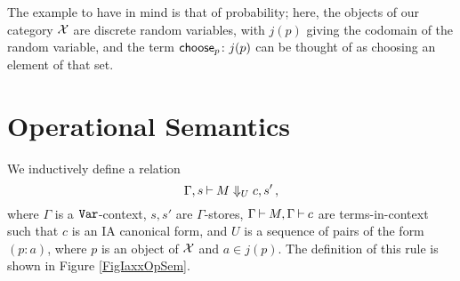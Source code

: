 The example to have in mind is that of probability; here, the objects of our category $\mathcal X$ are discrete random variables, with $j(p)$ giving the codomain of the random variable, and the term $\operatorname{\mathsf{choose}}_p\colon j(p)$ can be thought of as choosing an element of that set.

\section{Operational Semantics}

We inductively define a relation
\[
  \Gamma,s\mathbin{\vdash} M\Downarrow_U c,s'\,,
  \]
where $\Gamma$ is a ${\mathtt{Var}}$-context, $s,s'$ are $\Gamma$-stores, $\Gamma\mathbin{\vdash} M,\Gamma\mathbin{\vdash} c$ are \IAXX terms-in-context such that $c$ is an IA canonical form, and $U$ is a sequence of pairs of the form $(p:a)$, where $p$ is an object of $\mathcal X$ and $a\in j(p)$.
The definition of this rule is shown in Figure \ref{FigIaxxOpSem}.


